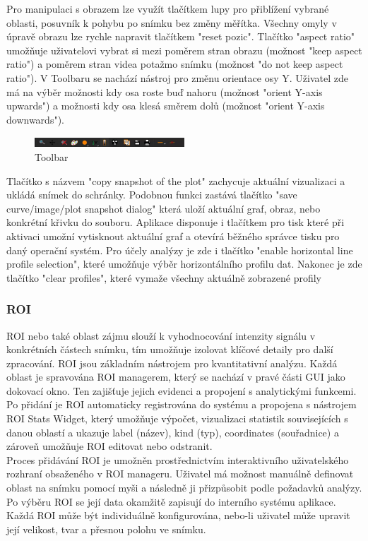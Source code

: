 \documentclass{article}
\begin{document}
Pro manipulaci s obrazem lze využít tlačítkem lupy pro přiblížení vybrané oblasti, posuvník k pohybu po snímku bez změny měřítka. Všechny omyly v úpravě obrazu lze rychle napravit tlačítkem "reset pozic". Tlačítko "aspect ratio" umožňuje uživatelovi vybrat si mezi poměrem stran obrazu (možnost "keep aspect  ratio") a poměrem stran videa potažmo snímku (možnost "do not keep aspect ratio"). V Toolbaru se nachází nástroj pro změnu orientace osy Y. Uživatel zde má na výběr možnosti kdy osa roste buď nahoru (možnost "orient Y-axis upwards") a možnosti kdy osa klesá směrem dolů (možnost "orient Y-axis downwards").\\
\begin{figure}[htp]
	\centering
	\includegraphics[width=0.5\textwidth]{images/Toolbar.png}
	\caption{Toolbar}
\end{figure}
Tlačítko s názvem "copy snapshot of the plot" zachycuje aktuální vizualizaci a ukládá snímek do schránky. Podobnou funkci zastává tlačítko "save curve/image/plot snapshot dialog" která uloží aktuální graf, obraz, nebo konkrétní křivku do souboru. Aplikace disponuje i tlačítkem pro tisk které při aktivaci umožní vytisknout aktuální graf a otevírá běžného správce tisku pro daný operační systém. Pro účely analýzy je zde i tlačítko "enable horizontal line profile selection", které umožňuje výběr horizontálního profilu dat. Nakonec je zde tlačítko "clear profiles", které vymaže všechny aktuálně zobrazené profily


\subsubsection{ROI}
ROI nebo také oblast zájmu slouží k vyhodnocování intenzity signálu v konkrétních částech snímku, tím umožňuje izolovat klíčové detaily pro další zpracování. ROI jsou základním nástrojem pro kvantitativní analýzu. Každá oblast je spravována ROI managerem, který se nachází v pravé části GUI jako dokovací okno. Ten zajišťuje jejich evidenci a propojení s analytickými funkcemi. Po přidání je ROI automaticky registrována do systému a propojena s nástrojem ROI Stats Widget, který umožňuje výpočet, vizualizaci statistik souvisejících s danou oblastí a ukazuje label (název), kind (typ), coordinates (souřadnice) a zároveň umožňuje ROI editovat nebo odstranit.\\

Proces přidávání ROI je umožněn prostřednictvím interaktivního uživatelského rozhraní obsaženého v ROI manageru. Uživatel má možnost manuálně definovat oblast na snímku pomocí myši a následně ji přizpůsobit podle požadavků analýzy. Po výběru ROI se její data okamžitě zapisují do interního systému aplikace. Každá ROI může být individuálně konfigurována, nebo-li uživatel může upravit její velikost, tvar a přesnou polohu ve snímku.\\
\end{document}
